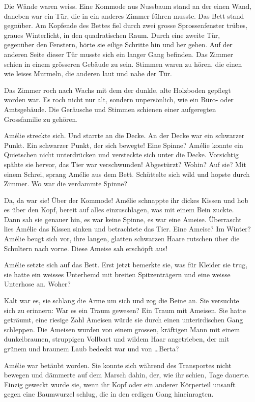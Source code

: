 \documentclass[11pt,titlepage,a5paper]{book}
\begin{document}
Die Wände waren weiss. Eine Kommode aus Nussbaum stand an der einen Wand, daneben war ein Tür, die in ein anderes Zimmer führen musste. Das Bett stand gegnüber. Am Kopfende des Bettes fiel durch zwei grosse Sprossenfenster trübes, graues Winterlicht, in den quadratischen Raum. Durch eine zweite Tür, gegenüber den Fenstern, hörte sie eilige Schritte hin und her gehen. Auf der anderen Seite dieser Tür musste sich ein langer Gang befinden. Das Zimmer schien in einem grösseren Gebäude zu sein. Stimmen waren zu hören, die einen wie leises Murmeln, die anderen laut und nahe der Tür.

Das Zimmer roch nach Wachs mit dem der dunkle, alte Holzboden gepflegt worden war. Es roch nicht nur alt, sondern unpersönlich, wie ein Büro- oder Amtsgebäude. Die Geräusche und Stimmen schienen einer aufgeregten Grossfamilie zu gehören.

Amélie streckte sich. Und starrte an die Decke. An der Decke war ein schwarzer Punkt. Ein schwarzer Punkt, der sich bewegte! Eine Spinne? Amélie konnte ein Quietschen nicht unterdrücken und versteckte sich unter die Decke. Vorsichtig spähte sie hervor, das Tier war verschwunden! Abgestürzt? Wohin? Auf sie? Mit einem Schrei, sprang Amélie aus dem Bett. Schüttelte sich wild und hopste durch Zimmer. Wo war die verdammte Spinne?

 Da, da war sie! Über der Kommode! Amélie schnappte ihr dickes Kissen und hob es über den Kopf, bereit auf alles einzuschlagen, was mit einem Bein zuckte. Dann sah sie genauer hin, es war keine Spinne, es war eine Ameise. Überrascht lies Amélie das Kissen sinken und betrachtete das Tier. Eine Ameise? Im Winter? Amélie beugt sich vor, ihre langen, glatten schwarzen Haare rutschen über die Schultern nach vorne. Diese Ameise sah erschöpft aus!

Amélie setzte sich auf das Bett. Erst jetzt bemerkte sie, was für Kleider sie trug, sie hatte ein weisses Unterhemd mit breiten Spitzenträgern und eine weisse Unterhose an. Woher? 

Kalt war es, sie schlang die Arme um sich und zog die Beine an. Sie versuchte sich zu erinnern: War es ein Traum gewesen? Ein Traum mit Ameisen. Sie hatte geträumt, eine riesige Zahl Ameisen würde sie durch einen unterirdischen Gang schleppen. Die Ameisen wurden von einem grossen, kräftigen Mann mit einem dunkelbraunen, struppigen Vollbart und wildem Haar angetrieben, der mit grünem und braunem Laub bedeckt war und von \dots Berta?

 Amélie war betäubt worden. Sie konnte sich während des Transportes nicht bewegen und dämmerte auf dem Marsch dahin, der, wie ihr schien, Tage dauerte. Einzig geweckt wurde sie, wenn ihr Kopf oder ein anderer Körperteil unsanft gegen eine Baumwurzel schlug, die  in den erdigen Gang hineinragten. 
 
\end{document}
